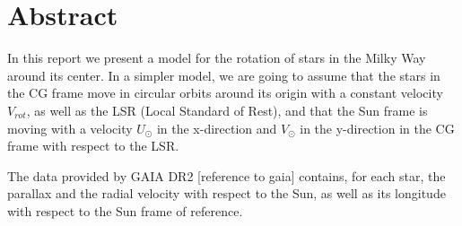 \section*{Abstract}

In this report we present a model for the rotation of stars in the Milky Way around its center.
In a simpler model, we are going to assume that the stars in the CG frame move in circular orbits around its origin with a constant velocity $V_{rot}$, as well as the LSR (Local Standard of Rest), and that the Sun frame is moving with a velocity $U_{\odot}$ in the x-direction and $V_{\odot}$ in the y-direction in the CG frame with respect to the LSR.



The data provided by GAIA DR2 [reference to gaia] contains, for each star, the parallax and the radial velocity with respect to the Sun, as well as its longitude with respect to the Sun frame of reference.